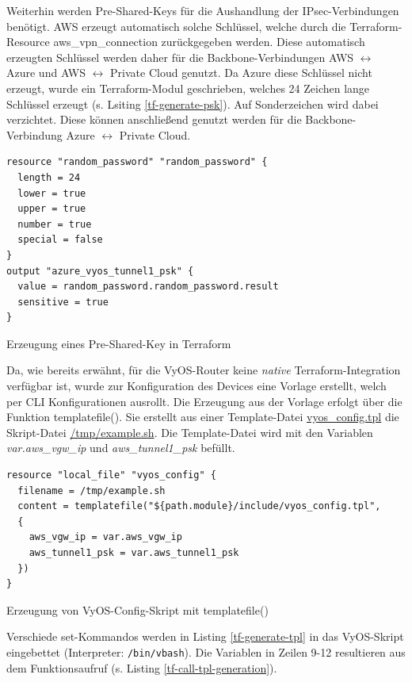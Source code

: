 Weiterhin werden Pre-Shared-Keys für die Aushandlung der IPsec-Verbindungen benötigt. AWS erzeugt automatisch solche Schlüssel, welche durch die Terraform-Resource \glqq aws\_vpn\_connection\grqq{} zurückgegeben werden. Diese automatisch erzeugten Schlüssel werden daher für die Backbone-Verbindungen AWS $\leftrightarrow$ Azure und AWS $\leftrightarrow$ Private Cloud genutzt. Da Azure diese Schlüssel nicht erzeugt, wurde ein Terraform-Modul geschrieben, welches 24 Zeichen lange Schlüssel erzeugt (s. Lsiting \ref{tf-generate-psk}). Auf Sonderzeichen wird dabei verzichtet. Diese können anschließend genutzt werden für die Backbone-Verbindung Azure $\leftrightarrow$ Private Cloud.
\begin{listing}[h]
\begin{verbatim}
resource "random_password" "random_password" {
  length = 24
  lower = true
  upper = true
  number = true
  special = false
}
output "azure_vyos_tunnel1_psk" {
  value = random_password.random_password.result
  sensitive = true
}
\end{verbatim}
\caption{Erzeugung eines Pre-Shared-Key in Terraform}
\label{tf-generate-psk}
\end{listing}\FloatBarrier
Da, wie bereits erwähnt, für die VyOS-Router keine \textit{native} Terraform-Integration verfügbar ist, wurde zur Konfiguration des Devices eine Vorlage erstellt, welch per CLI Konfigurationen ausrollt.
Die Erzeugung aus der Vorlage erfolgt über die Funktion templatefile()\cite{templatefiletf2021}. Sie erstellt aus einer Template-Datei \underline{vyos\_config.tpl} die Skript-Datei \underline{/tmp/example.sh}. Die Template-Datei wird mit den Variablen \textit{var.aws\_vgw\_ip} und \textit{aws\_tunnel1\_psk} befüllt.
\begin{listing}[h]
\begin{verbatim}
resource "local_file" "vyos_config" {
  filename = /tmp/example.sh
  content = templatefile("${path.module}/include/vyos_config.tpl",
  {
    aws_vgw_ip = var.aws_vgw_ip
    aws_tunnel1_psk = var.aws_tunnel1_psk
  })
}

\end{verbatim}
\caption{Erzeugung von VyOS-Config-Skript mit templatefile()}
\label{tf-call-tpl-generation}
\end{listing}\FloatBarrier
Verschiede set-Kommandos werden in Listing \ref{tf-generate-tpl} in das VyOS-Skript eingebettet (Interpreter: \texttt{/bin/vbash}). Die Variablen in Zeilen 9-12 resultieren aus dem Funktionsaufruf (s. Listing \ref{tf-call-tpl-generation}).
